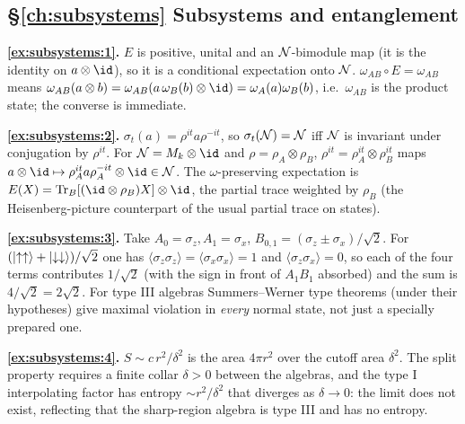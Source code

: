 {\subsection*{\S\ref{ch:subsystems} Subsystems and entanglement}
\textbf{\ref{ex:subsystems:1}.} $E$ is positive, unital and an $\mathcal{N}$-bimodule map (it is the identity on $a\otimes\id$), so it is a conditional expectation onto $\mathcal{N}$. $\omega_{AB}\circ E=\omega_{AB}$ means $\omega_{AB}(a\otimes b)=\omega_{AB}(a\,\omega_B(b)\otimes\id)=\omega_A(a)\omega_B(b)$, i.e.\ $\omega_{AB}$ is the product state; the converse is immediate.\par
\textbf{\ref{ex:subsystems:2}.} $\sigma_t(a)=\rho^{it}a\rho^{-it}$, so $\sigma_t(\mathcal{N})=\mathcal{N}$ iff $\mathcal{N}$ is invariant under conjugation by $\rho^{it}$. For $\N=M_k\otimes\id$ and $\rho=\rho_A\otimes\rho_B$, $\rho^{it}=\rho_A^{it}\otimes\rho_B^{it}$ maps $a\otimes\id\mapsto\rho_A^{it}a\rho_A^{-it}\otimes\id\in\N$. The $\omega$-preserving expectation is $E(X)=\Tr_B[(\id\otimes\rho_B)X]\otimes\id$, the partial trace weighted by $\rho_B$ (the Heisenberg-picture counterpart of the usual partial trace on states).\par
\textbf{\ref{ex:subsystems:3}.} Take $A_0=\sigma_z,A_1=\sigma_x$, $B_{0,1}=(\sigma_z\pm\sigma_x)/\sqrt2$. For $(\lvert \uparrow\uparrow\rangle+\lvert \downarrow\downarrow\rangle)/\sqrt2$ one has $\langle\sigma_z\sigma_z\rangle=\langle\sigma_x\sigma_x\rangle=1$ and $\langle\sigma_z\sigma_x\rangle=0$, so each of the four terms contributes $1/\sqrt2$ (with the sign in front of $A_1B_1$ absorbed) and the sum is $4/\sqrt2=2\sqrt2$. For type III algebras Summers--Werner type theorems (under their hypotheses) give maximal violation in \emph{every} normal state, not just a specially prepared one.\par
\textbf{\ref{ex:subsystems:4}.} $S\sim c\,r^2/\delta^2$ is the area $4\pi r^2$ over the cutoff area $\delta^2$. The split property requires a finite collar $\delta>0$ between the algebras, and the type I interpolating factor has entropy $\sim r^2/\delta^2$ that diverges as $\delta\to0$: the limit does not exist, reflecting that the sharp-region algebra is type III and has no entropy.\par

}
